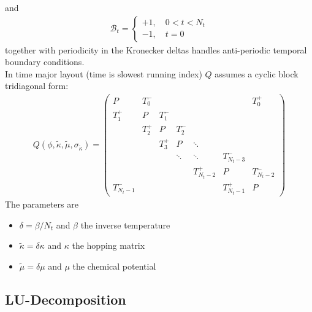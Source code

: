 \documentclass[a4paper, fleqn, twoside, notitlepage]{scrartcl}
\begin{document}
and
\begin{align}
  \mathcal{B}_t =
  \begin{cases}
    +1,\quad 0 < t < N_t\\
    -1,\quad t = 0
  \end{cases}
\end{align}
together with periodicity in the Kronecker deltas handles anti-periodic temporal boundary conditions.\\
In time major layout (time is slowest running index) $Q$ assumes a cyclic block tridiagonal form:
\begin{align}
  Q(\phi, \tilde{\kappa}, \tilde{\mu}, \sigma_{\tilde{\kappa}}) =
  \begin{pmatrix}
    P         & T^-_0 &       &         &           &              & T^+_0    \\
    T^+_1     & P     & T^-_1 &         &           &              &          \\
              & T^+_2 & P     & T^-_2   &           &              &          \\
              &       & T^+_3 & P      & \ddots         &              &          \\
              &       &       & \ddots     & \ddots         & T^-_{N_t-3}    &          \\
              &       &       &        & T^+_{N_t-2} & P            & T^-_{N_t-2}\\
    T^-_{N_t-1} &       &       &        &           & T^+_{N_t-1}    & P
  \end{pmatrix}
\end{align}
The parameters are
\begin{itemize}
\item $\delta = \beta / N_t$ and $\beta$ the inverse temperature
\item $\tilde{\kappa} = \delta\kappa$ and $\kappa$ the hopping matrix
\item $\tilde{\mu} = \delta\mu$ and $\mu$ the chemical potential
\end{itemize}

\subsection{LU-Decomposition}\label{sec:lu_decomposition_v2}
\end{document}
